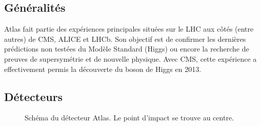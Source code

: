 \documentclass[11pt]{article} %
\begin{document}
\subsection{Généralités}

Atlas fait partie des expériences principales situées sur le LHC aux côtés (entre autres) de CMS, ALICE et LHCb. Son objectif est de confirmer les dernières prédictions non testées du Modèle Standard (Higgs) ou encore la recherche de preuves de supersymétrie et de nouvelle physique. Avec CMS, cette expérience a effectivement permis la découverte du boson de Higgs en 2013.

\subsection{Détecteurs}

\begin{figure}[H]
\centering
  \caption{Schéma du détecteur Atlas. Le point d'impact se trouve au centre.}
\label{fig:atlas_detector}
\end{figure}
\end{document}
